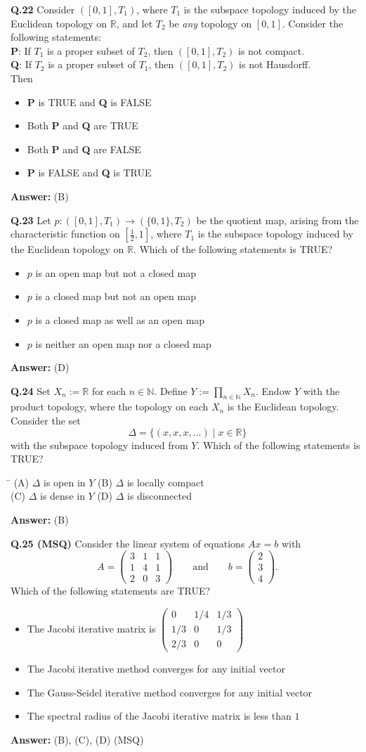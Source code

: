 \documentclass[11pt,a4paper]{article}
\newcommand{\optsfourA}[4]{%
  \begin{tabbing}
    \hspace{0.48\linewidth}\=\kill
    (A) #1 \> (B) #2 \\[2pt]
    (C) #3 \> (D) #4
  \end{tabbing}%
}
\newcommand{\optslistA}[4]{%
  \begin{itemize}
    \setlength{\itemsep}{2pt}\setlength{\parskip}{0pt}
    \item[(A)] #1
    \item[(B)] #2
    \item[(C)] #3
    \item[(D)] #4
  \end{itemize}%
}
\newcommand{\ans}[1]{\textbf{Answer:} #1\par\medskip}
\begin{document}
\textbf{Q.22} Consider $([0, 1], T_1)$, where $T_1$ is the subspace topology induced by the Euclidean topology on $\mathbb{R}$, and let $T_2$ be \textit{any} topology on $[0, 1]$. Consider the following statements:\\
\textbf{P}: If $T_1$ is a proper subset of $T_2$, then $([0, 1], T_2)$ is not compact.\\
\textbf{Q}: If $T_2$ is a proper subset of $T_1$, then $([0, 1], T_2)$ is not Hausdorff.\\
Then
\optslistA{\textbf{P} is TRUE and \textbf{Q} is FALSE}{Both \textbf{P} and \textbf{Q} are TRUE}{Both \textbf{P} and \textbf{Q} are FALSE}{\textbf{P} is FALSE and \textbf{Q} is TRUE}
\ans{(B)}

\textbf{Q.23} Let $p : ([0, 1], T_1) \to (\{0, 1\}, T_2)$ be the quotient map, arising from the characteristic function on $\left[\frac{1}{2}, 1\right]$, where $T_1$ is the subspace topology induced by the Euclidean topology on $\mathbb{R}$. Which of the following statements is TRUE?
\optslistA{$p$ is an open map but not a closed map}{$p$ is a closed map but not an open map}{$p$ is a closed map as well as an open map}{$p$ is neither an open map nor a closed map}
\ans{(D)}

\textbf{Q.24} Set $X_n := \mathbb{R}$ for each $n \in \mathbb{N}$. Define $Y := \displaystyle\prod_{n \in \mathbb{N}} X_n$. Endow $Y$ with the product topology, where the topology on each $X_n$ is the Euclidean topology. Consider the set
\[
  \Delta = \{(x, x, x, \dots) \mid x \in \mathbb{R}\}
\]
with the subspace topology induced from $Y$. Which of the following statements is TRUE?
\optsfourA{$\Delta$ is open in $Y$}{$\Delta$ is locally compact}{$\Delta$ is dense in $Y$}{$\Delta$ is disconnected}
\ans{(B)}

\textbf{Q.25 (MSQ)} Consider the linear system of equations $Ax = b$ with
\[
  A = \begin{pmatrix} 3 & 1 & 1 \\ 1 & 4 & 1 \\ 2 & 0 & 3 \end{pmatrix} \qquad \text{and} \qquad b = \begin{pmatrix} 2 \\ 3 \\ 4 \end{pmatrix}.
\]
Which of the following statements are TRUE?
\optslistA{The Jacobi iterative matrix is $\begin{pmatrix} 0 & 1/4 & 1/3 \\ 1/3 & 0 & 1/3 \\ 2/3 & 0 & 0 \end{pmatrix}$}{The Jacobi iterative method converges for any initial vector}{The Gauss-Seidel iterative method converges for any initial vector}{The spectral radius of the Jacobi iterative matrix is less than $1$}
\ans{(B), (C), (D) (MSQ)}
\end{document}
